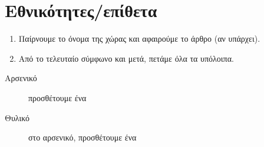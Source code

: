 \section*{Εθνικότητες/επίθετα}

\begin{enumerate}
\item Παίρνουμε το όνομα της χώρας και αφαιρούμε το άρθρο (αν υπάρχει).
\item Από το τελευταίο σύμφωνο και μετά, πετάμε όλα τα υπόλοιπα.
\end{enumerate}

\begin{description}
\item[Αρσενικό] προσθέτουμε ένα 
\item[Θυλικό] στο αρσενικό, προσθέτουμε ένα 
\end{description}
